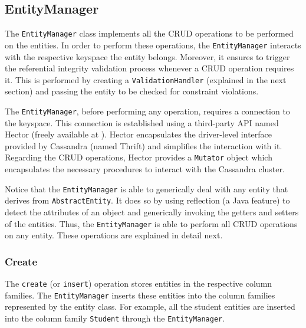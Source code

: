 	\subsection{EntityManager}

	The  \texttt{EntityManager} class implements  all
	the \ac{CRUD} operations to be performed on the entities. In order to perform
	these operations,  the \texttt{EntityManager} interacts with the respective
	keyspace the entity belongs. Moreover, it ensures to trigger the   referential
	integrity validation process whenever a \ac{CRUD} operation requires it. This
	is performed by creating a  \texttt{ValidationHandler} (explained in the next
	section) and passing the entity to be checked for constraint violations. 
	
	The \texttt{EntityManager}, before performing any operation, requires a
	connection to the keyspace. This connection is established using a third-party
	\ac{API} named Hector (freely available at ). Hector
	 encapsulates the driver-level interface provided by Cassandra (named Thrift) 
	 and simplifies the interaction with it. Regarding the \ac{CRUD} 
	 operations, Hector provides  a \texttt{Mutator} object which encapsulates the
	 necessary procedures to interact with the Cassandra cluster.    
	 
	 Notice that  the \texttt{EntityManager} is able to generically deal with any
	 entity that derives from \texttt{AbstractEntity}. It does so by using
	 reflection (a Java  feature) to detect the attributes of an object and
	 generically invoking the getters and setters of the entities. Thus, the
	 \texttt{EntityManager} is able to perform all \ac{CRUD} operations on
	 any entity. These operations are explained in detail next.  
	 
	 
	
	
	
	
	
		\subsubsection{Create}
		 The \texttt{create} (or \texttt{insert}) operation stores entities in the
		 respective column families. The \texttt{EntityManager} inserts these entities
		into the column families represented by the entity class.  
		For example,  all the student entities are inserted into the column family
		\texttt{Student} through the \texttt{EntityManager}. 
		
